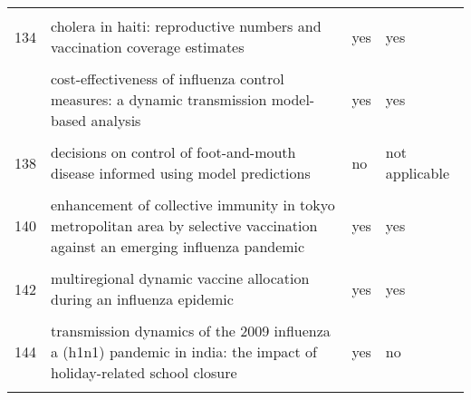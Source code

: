 \documentclass[
]{article}
\begin{document}
\begin{landscape}
\begin{longtable}{l>{\raggedright\arraybackslash}p{9cm}ll}
\cellcolor{gray!6}{133} & \cellcolor{gray!6}{an optimal control problem arising from a dengue disease transmission model} & \cellcolor{gray!6}{no} & \cellcolor{gray!6}{not applicable}\\
134 & cholera in haiti: reproductive numbers and vaccination coverage estimates & yes & yes\\
\cellcolor{gray!6}{135} & \cellcolor{gray!6}{comparing control strategies against foot-and-mouth disease: will vaccination be cost-effective in denmark?} & \cellcolor{gray!6}{yes} & \cellcolor{gray!6}{no}\\
\addlinespace
136 & cost-effectiveness of influenza control measures: a dynamic transmission model-based analysis & yes & yes\\
\cellcolor{gray!6}{137} & \cellcolor{gray!6}{cost-effectiveness of workplace closure and travel restriction for mitigating influenza outbreaks: a network-based simulation} & \cellcolor{gray!6}{no} & \cellcolor{gray!6}{not applicable}\\
138 & decisions on control of foot-and-mouth disease informed using model predictions & no & not applicable\\
\cellcolor{gray!6}{139} & \cellcolor{gray!6}{dengue in cape verde: vector control and vaccination} & \cellcolor{gray!6}{no} & \cellcolor{gray!6}{not applicable}\\
140 & enhancement of collective immunity in tokyo metropolitan area by selective vaccination against an emerging influenza pandemic & yes & yes\\
\addlinespace
\cellcolor{gray!6}{141} & \cellcolor{gray!6}{estimated impact of aggressive empirical antiviral treatment in containing an outbreak of pandemic influenza h1n1 in an isolated first nations community} & \cellcolor{gray!6}{yes} & \cellcolor{gray!6}{yes}\\
142 & multiregional dynamic vaccine allocation during an influenza epidemic & yes & yes\\
\cellcolor{gray!6}{143} & \cellcolor{gray!6}{policies to reduce influenza in the workplace: impact assessments using an agent-based model} & \cellcolor{gray!6}{no} & \cellcolor{gray!6}{not applicable}\\
144 & transmission dynamics of the 2009 influenza a (h1n1) pandemic in india: the impact of holiday-related school closure & yes & no\\
\cellcolor{gray!6}{145} & \cellcolor{gray!6}{vaccination against foot-and-mouth disease: do initial conditions affect its benefit?} & \cellcolor{gray!6}{yes} & \cellcolor{gray!6}{yes}\\

\end{longtable}
\end{landscape}
\end{document}

